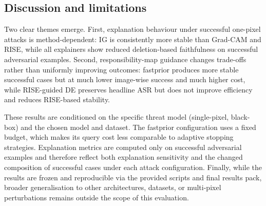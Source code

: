 \subsection{Discussion and limitations}
Two clear themes emerge.
First, explanation behaviour under successful one-pixel attacks is method-dependent: IG is consistently more stable than Grad-CAM and RISE, while all explainers show reduced deletion-based faithfulness on successful adversarial examples.
Second, responsibility-map guidance changes trade-offs rather than uniformly improving outcomes: fastprior produces more stable successful cases but at much lower image-wise success and much higher cost, while RISE-guided DE preserves headline ASR but does not improve efficiency and reduces RISE-based stability.

These results are conditioned on the specific threat model (single-pixel, black-box) and the chosen model and dataset.
The fastprior configuration uses a fixed budget, which makes its query cost less comparable to adaptive stopping strategies.
Explanation metrics are computed only on successful adversarial examples and therefore reflect both explanation sensitivity and the changed composition of successful cases under each attack configuration.
Finally, while the results are frozen and reproducible via the provided scripts and final results pack, broader generalisation to other architectures, datasets, or multi-pixel perturbations remains outside the scope of this evaluation.
